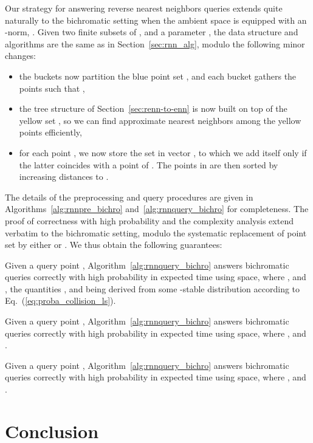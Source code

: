 Our strategy for answering reverse nearest neighbors queries extends
quite naturally to the bichromatic setting when the ambient space is
 equipped with an -norm, . Given two finite
  subsets  of , and a parameter , the data
  structure and algorithms are the same as in
  Section~\ref{sec:rnn_alg}, modulo the following minor changes:
\begin{itemize}
\item the buckets  now partition the blue point
  set , and each bucket  gathers the points  such that
  ,
\item the tree structure of Section~\ref{sec:renn-to-enn} is now built
  on top of the yellow set , so we can find approximate nearest
  neighbors among the yellow points efficiently,
\item for each point , we now store the set
   in vector , to which we add  itself
  only if the latter coincides with a point of . The points in
   are then sorted by increasing distances to .
\end{itemize}
The details of the preprocessing and query procedures are given in
Algorithms~\ref{alg:rnnpre_bichro} and~\ref{alg:rnnquery_bichro} for
completeness. The proof of correctness with high probability and the
complexity analysis extend verbatim to the bichromatic setting, modulo
the systematic replacement of point set  by either  or . We
thus obtain the following guarantees:
\begin{thm}\label{thm:rnnquery_bichro}
Given a query point ,
Algorithm~\ref{alg:rnnquery_bichro} answers bichromatic \rnn
queries correctly with high probability in expected  time using  space, where
,  and
, the quantities
,  and
 being derived from some
-stable distribution  according to
Eq.~(\ref{eq:proba_collision_ls}).
\end{thm}
\addtocounter{thm}{-1}
\begin{thm}[case ]\label{thm:rnnquery_bichro_l1}
Given a query point ,
Algorithm~\ref{alg:rnnquery_bichro} answers bichromatic \rnn queries
correctly with high probability in expected  time
using 
space, where ,  and
.
\end{thm}
\addtocounter{thm}{-1}
\begin{thm}[case ]\label{thm:rnnquery_bichro_l2}
Given a query point ,
Algorithm~\ref{alg:rnnquery_bichro} answers bichromatic \rnn queries
correctly with high probability in expected  time
using 
space, where ,  and .
\end{thm}


\section{Conclusion}



